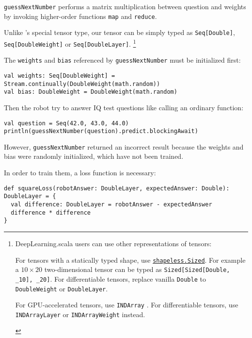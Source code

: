 \lstinline{guessNextNumber} performs a matrix multiplication between question and weights by invoking higher-order functions \lstinline{map} and \lstinline{reduce}. 

Unlike \cite{chen2017typesafe}'s special tensor type, our tensor can be simply typed as \lstinline{Seq[Double]}, \lstinline{Seq[DoubleWeight]} or \lstinline{Seq[DoubleLayer]}.
\footnote{DeepLearning.scala users can use other representations of tensors:
\begin{enumerate*}
  \item For tensors with a statically typed shape, use \href{https://javadoc.io/page/com.chuusai/shapeless_2.11/latest/shapeless/Sized.html}{ \lstinline{shapeless.Sized}}. For example a $10\times20$ two-dimensional tensor can be typed as \lstinline{Sized[Sized[Double, _10], _20]}. For differentiable tensors, replace vanilla \lstinline{Double} to \lstinline{DoubleWeight} or \lstinline{DoubleLayer}.
  \item For GPU-accelerated tensors, use \lstinline{INDArray} \cite{skymind2017nd4j}. For differentiable tensors, use \lstinline{INDArrayLayer} or \lstinline{INDArrayWeight} instead.
\end{enumerate*}
}

The \lstinline{weights} and \lstinline{bias} referenced by \lstinline{guessNextNumber} must be initialized first:

\begin{lstlisting}[float={htbp},caption={Weight initialization}]
val weights: Seq[DoubleWeight] = Stream.continually(DoubleWeight(math.random))
val bias: DoubleWeight = DoubleWeight(math.random)
\end{lstlisting}

Then the robot try to answer IQ test questions like calling an ordinary function:

\begin{lstlisting}[float={htbp},caption={Inference on an untrained model}]
val question = Seq(42.0, 43.0, 44.0)
println(guessNextNumber(question).predict.blockingAwait)
\end{lstlisting}

However, \lstinline{guessNextNumber} returned an incorrect result because the weights and bias were randomly initialized, which have not been trained.

In order to train them, a loss function is necessary:

\begin{lstlisting}[float={htbp},caption={The differentiable square loss function},label={squareLoss}]
def squareLoss(robotAnswer: DoubleLayer, expectedAnswer: Double): DoubleLayer = {
  val difference: DoubleLayer = robotAnswer - expectedAnswer
  difference * difference
}
\end{lstlisting}

